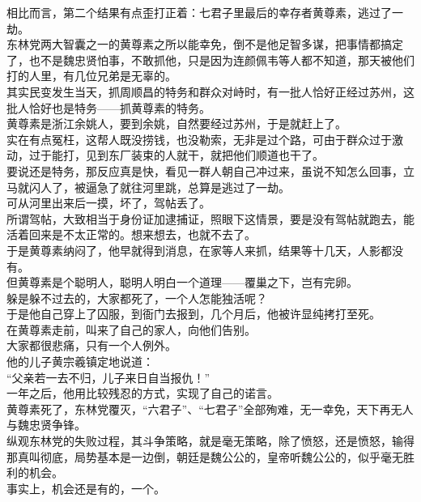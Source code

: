 \begin{multicols}{\theparacolNo}
相比而言，第二个结果有点歪打正着：七君子里最后的幸存者黄尊素，逃过了一劫。\\

东林党两大智囊之一的黄尊素之所以能幸免，倒不是他足智多谋，把事情都搞定了，也不是魏忠贤怕事，不敢抓他，只是因为连颜佩韦等人都不知道，那天被他们打的人里，有几位兄弟是无辜的。\\

其实民变发生当天，抓周顺昌的特务和群众对峙时，有一批人恰好正经过苏州，这批人恰好也是特务——抓黄尊素的特务。\\

黄尊素是浙江余姚人，要到余姚，自然要经过苏州，于是就赶上了。\\

实在有点冤枉，这帮人既没捞钱，也没勒索，无非是过个路，可由于群众过于激动，过于能打，见到东厂装束的人就干，就把他们顺道也干了。\\

要说还是特务，那反应真是快，看见一群人朝自己冲过来，虽说不知怎么回事，立马就闪人了，被逼急了就往河里跳，总算是逃过了一劫。\\

可从河里出来后一摸，坏了，驾帖丢了。\\

所谓驾帖，大致相当于身份证加逮捕证，照眼下这情景，要是没有驾帖就跑去，能活着回来是不太正常的。想来想去，也就不去了。\\

于是黄尊素纳闷了，他早就得到消息，在家等人来抓，结果等十几天，人影都没有。\\

但黄尊素是个聪明人，聪明人明白一个道理——覆巢之下，岂有完卵。\\

躲是躲不过去的，大家都死了，一个人怎能独活呢？\\

于是他自己穿上了囚服，到衙门去报到，几个月后，他被许显纯拷打至死。\\

在黄尊素走前，叫来了自己的家人，向他们告别。\\

大家都很悲痛，只有一个人例外。\\

他的儿子黄宗羲镇定地说道：\\

“父亲若一去不归，儿子来日自当报仇！”\\

一年之后，他用比较残忍的方式，实现了自己的诺言。\\

黄尊素死了，东林党覆灭，“六君子”、“七君子”全部殉难，无一幸免，天下再无人与魏忠贤争锋。\\

纵观东林党的失败过程，其斗争策略，就是毫无策略，除了愤怒，还是愤怒，输得那真叫彻底，局势基本是一边倒，朝廷是魏公公的，皇帝听魏公公的，似乎毫无胜利的机会。\\

事实上，机会还是有的，一个。\\
\ifnum{}
	\end{multicols}
\fi
\newpage
